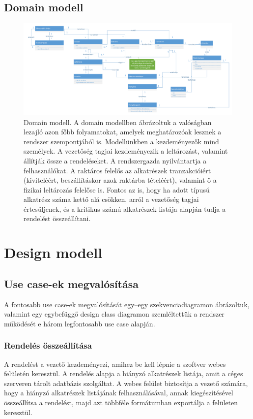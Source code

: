 \documentclass[12pt]{article}\usepackage[left=20mm,right=20mm,top=14mm,bottom=20mm]{geometry}
\begin{document}
\thispagestyle{empty}
\begin{landscape}
\section{Domain modell}
\begin{figure}[!h]
    \centering
        \includegraphics[width=1.4\textwidth]{kepek/Domain_model.pdf}
        \caption{Domain modell. A domain modellben ábrázoltuk a valóságban lezajló azon főbb folyamatokat, amelyek meghatározóak lesznek a rendszer szempontjából is. Modellünkben a kezdeményezők mind személyek.
A vezetőség tagjai kezdeményezik a leltározást, valamint állítják össze a rendeléseket.
A rendszergazda nyilvántartja a felhasználókat.
A raktáros felelős az alkatrészek tranzakcióiért (kiviteléért, beszállításkor azok raktárba tételéért), valamint ő a fizikai leltározás felelőse is. 
Fontos az is, hogy ha adott típusú alkatrész száma kettő alá csökken, arról a vezetőség tagjai értesüljenek, és a kritikus számú alkatrészek listája alapján tudja a rendelést összeállítani.}
\end{figure}
\end{landscape}

\section{Design modell}
\subsection{Use case-ek megvalósítása}
A fontosabb use case-ek megvalósítását egy--egy szekvenciadiagramon ábrázoltuk, valamint egy egybefüggő design class diagramon szemléltettük a rendszer működését e három legfontosabb use case alapján.

\subsubsection{Rendelés összeállítása}
A rendelést a vezető kezdeményezi, amihez be kell lépnie a  szoftver webes felületén keresztül.
A rendelés alapja a hiányzó alkatrészek listája, amit a céges szerveren tárolt adatbázis szolgáltat. 
A webes felület biztosítja a vezető számára, hogy a hiányzó alkatrészek listájának felhasználásával, annak kiegészítésével összeállítsa a rendelést, majd azt többféle formátumban exportálja a felületen keresztül.
\end{document}
